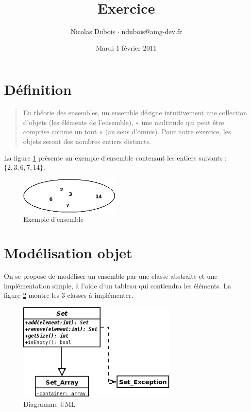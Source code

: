 \documentclass[a4paper]{scrartcl}
\title{Exercice}
\author{\titlefont Nicolas Dubois $\cdot$ ndubois@amg-dev.fr}
\date{\sf Mardi 1 février 2011}
\begin{document}
\maketitle


\section{Définition}

\begin{quotation}
En théorie des ensembles, un ensemble désigne intuitivement une collection d’objets (les éléments de l'ensemble), 
« une multitude qui peut être comprise comme un tout » (au sens d'omnis). Pour notre exercice, les objets seront des nombres entiers distincts.
\end{quotation}

La figure \ref{fig:set} présente un exemple d'ensemble contenant les entiers suivants : $\{ 2, 3, 6, 7, 14 \}$.

\begin{figure}[ht!]
\begin{center}
\includegraphics[width=5cm]{../images/Set.png}
\end{center}
\caption{Exemple d'ensemble}
\label{fig:set}
\end{figure}

\section{Modélisation objet}

On se propose de modéliser un ensemble par une classe abstraite et une implémentation simple, à l'aide 
d'un tableau qui contiendra les éléments. La figure \ref{fig:uml-diagram} montre les 3 classes à implémenter. 

\begin{figure}[ht!]
\begin{center}
\includegraphics[width=8cm]{../images/UML-Diagram.png}
\end{center}
\caption{Diagramme UML}
\label{fig:uml-diagram}
\end{figure}
\end{document}
